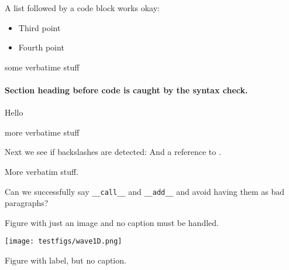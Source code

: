 \documentclass[%
oneside,                 %
final,                   %
10pt]{article}
\newcounter{doconce:movie:counter}
\begin{document}

\newcommand{\exercisesection}[1]{\subsection*{#1}}







A list followed by a code block works okay:

\begin{itemize}
  \item Third point

  \item Fourth point
\end{itemize}

\noindent


\bcod
some verbatime stuff

\ecod


\paragraph{Section heading before code is caught by the syntax check.}
\label{my} 

Hello


\bdat
more verbatime stuff

\edat


Next we see if backslashes are detected: 
And a reference to \cite{mybook}.



\bdat
More verbatim stuff.

\edat


Can we successfully say \Verb!__call__! and \Verb!__add__! and avoid having them as
bad paragraphs?

Figure with just an image and no caption must be handled.

\vspace{6mm}

\centerline{\texttt{[image: testfigs/wave1D.png]}}

\vspace{6mm}

Figure with label, but no caption.
\end{document}
